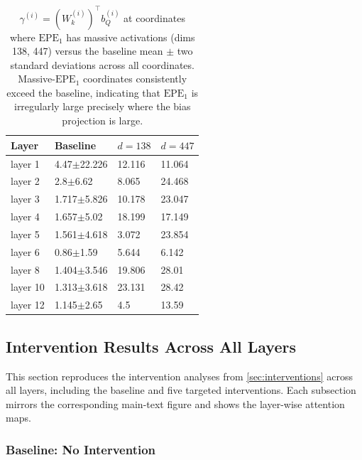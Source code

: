 \documentclass[11pt]{article}
\begin{document}
\begin{table}[t]
  \centering
  \begin{tabular}{llll}
    \hline
    \textbf{Layer} & \textbf{Baseline} & \textbf{$d{=}138$} & \textbf{$d{=}447$}\\
    \hline
    layer 1   &   4.47$\pm$22.226 &  12.116   &    11.064        \\
    layer 2   &   2.8$\pm$6.62    &    8.065   &    24.468         \\
    layer 3   &   1.717$\pm$5.826 &    10.178  &    23.047        \\
    layer 4   &   1.657$\pm$5.02  &   18.199   &     17.149         \\
    layer 5   &   1.561$\pm$4.618 &    3.072   &    23.854          \\
    layer 6   &   0.86$\pm$1.59   &    5.644   &    6.142          \\
    layer 8   &   1.404$\pm$3.546 &    19.806  &    28.01          \\
    layer 10  &   1.313$\pm$3.618 &    23.131  &    28.42        \\
    layer 12   &   1.145$\pm$2.65 &    4.5  &    13.59         \\

    \hline
  \end{tabular}
  \caption{$\gamma^{(i)}=(W_k^{(i)})^\top b_Q^{(i)}$ at coordinates where $\mathrm{EPE}_1$ has massive activations (dims 138, 447) versus the baseline mean $\pm$ two standard deviations across all coordinates. Massive-$\mathrm{EPE}_1$ coordinates consistently exceed the baseline, indicating that $\mathrm{EPE}_1$ is irregularly large precisely where the bias projection is large.}
  \label{tab:appendix_coor_align}
\end{table}

\subsection{Intervention Results Across All Layers}\label{app:interventions}

This section reproduces the intervention analyses from \cref{sec:interventions} across all layers, including the baseline and five targeted interventions. Each subsection mirrors the corresponding main-text figure and shows the layer-wise attention maps.

\subsubsection{Baseline: No Intervention}\label{app:no_intervention}
\end{document}
